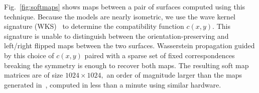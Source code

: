 %
Fig.~\ref{fig:softmaps} shows maps between a pair of surfaces computed using this technique.  Because the models are nearly isometric, we use the wave kernel signature (WKS)~\cite{aubry-2011} to determine the compatibility function $c(x,y)$.  This signature is unable to distinguish between the orientation-preserving and left/right flipped maps between the two surfaces.  Wasserstein propagation guided by this choice of $c(x,y)$ paired with a sparse set of fixed correspondences breaking the symmetry is enough to recover both maps.  The resulting soft map matrices are of size $1024\times 1024,$ an order of magnitude larger than the maps generated in~\cite{solomon-2012}, computed in less than a minute using similar hardware.